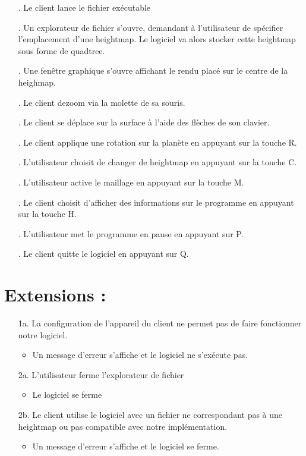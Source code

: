 \documentclass[12pt]{report}
\begin{document}
\begin{enumerate}

\item[\sffamily 1.] Le client lance le fichier exécutable 
\item[\sffamily 2.] Un explorateur de fichier s'ouvre, demandant à l'utilisateur de spécifier l'emplacement d'une heightmap. Le logiciel va alors stocker cette heightmap sous forme de quadtree.
\item[\sffamily 3.] Une fenêtre graphique s'ouvre affichant le rendu placé sur le centre de la heighmap.
\item[\sffamily 4.] Le client dezoom via la molette de sa souris.
\item[\sffamily 5.] Le client se déplace sur la surface à l'aide des flèches de son clavier. 
\item[\sffamily 6.] Le client applique une rotation sur la planète en appuyant sur la touche R.
\item[\sffamily 7.] L'utilisateur choisit de changer de heightmap en appuyant sur la touche C.
\item[\sffamily 8.] L'utilisateur active le maillage en appuyant sur la touche M.
\item[\sffamily 9.] Le client choisit d'afficher des informations sur le programme en appuyant sur la touche H.
\item[\sffamily 11.] L'utilisateur met le programme en pause en appuyant sur P.
\item[\sffamily 10.] Le client quitte le logiciel en appuyant sur Q.



\end{enumerate}

\section{Extensions :}

\begin{enumerate}

    \item[\sffamily 1a.] La configuration de l'appareil du client ne permet pas de  faire fonctionner notre logiciel.
    \begin{itemize}
        \item Un message d'erreur s'affiche et le logiciel ne s'exécute pas.
    \end{itemize}
    \item[\sffamily 2a.] L'utilisateur ferme l'explorateur de fichier
    \begin{itemize}
        \item Le logiciel se ferme
    \end{itemize}
    \item[\sffamily 2b.] Le client utilise le logiciel avec un fichier ne correspondant pas à une heightmap ou pas compatible avec notre implémentation.
    \begin{itemize}
        \item Un message d'erreur s'affiche et le logiciel se ferme.
    \end{itemize}
    



\end{enumerate}
\end{document}
